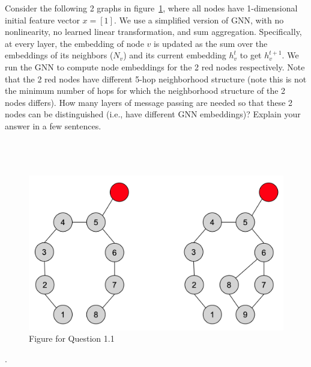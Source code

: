 \documentclass{article}
\numberwithin{figure}{section}
\begin{document}
	Consider the following 2 graphs in figure~\ref{fig:Q4.1}, where all nodes have 1-dimensional initial feature vector $x = [1]$. We use a simplified version of GNN, with no nonlinearity,
	no learned linear transformation, and sum aggregation. Specifically, at every
	layer, the embedding of node $v$ is updated as the sum over the embeddings of
	its neighbors ($N_v$) and its current embedding $h^t_v$ to get $h^{t+1}_v$. We run the GNN
	to compute node embeddings for the 2 red nodes respectively. Note that the 2 red nodes have different 5-hop neighborhood structure (note this is not the minimum number of hops for which the neighborhood structure of the 2 nodes differs). How many layers of message passing are needed so that these 2 nodes can be distinguished (i.e., have different GNN embeddings)? Explain your answer in a few sentences.
	\\\\\\\\
	\begin{figure}[!htb]
		\centering
		\includegraphics[width=0.6\columnwidth]{fig4-1.png}
		\caption{Figure for Question 1.1}
		\label{fig:Q4.1}
	\end{figure}
	
	.\\
	
\end{document}
